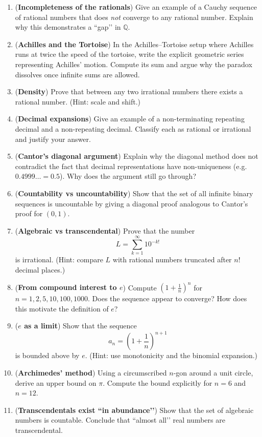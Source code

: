 \begin{enumerate}

\item (\textbf{Incompleteness of the rationals})
Give an example of a Cauchy sequence of rational numbers that does \emph{not} converge
to any rational number. Explain why this demonstrates a “gap’’ in $\mathbb{Q}$.

\item (\textbf{Achilles and the Tortoise})
In the Achilles–Tortoise setup where Achilles runs at twice the speed of the tortoise,
write the explicit geometric series representing Achilles’ motion.  
Compute its sum and argue why the paradox dissolves once infinite sums are allowed.

\item (\textbf{Density})
Prove that between any two irrational numbers there exists a rational number.
(Hint: scale and shift.)

\item (\textbf{Decimal expansions})
Give an example of a non-terminating repeating decimal and a non-repeating decimal.
Classify each as rational or irrational and justify your answer.

\item (\textbf{Cantor’s diagonal argument})
Explain why the diagonal method does not contradict the fact that decimal
representations have non-uniqueness (e.g.\ $0.4999\ldots = 0.5$).
Why does the argument still go through?

\item (\textbf{Countability vs uncountability})
Show that the set of all infinite binary sequences is uncountable
by giving a diagonal proof analogous to Cantor’s proof for $(0,1)$.

\item (\textbf{Algebraic vs transcendental})
Prove that the number
\[
L = \sum_{k=1}^\infty 10^{-k!}
\]
is irrational.  
(Hint: compare $L$ with rational numbers truncated after $n!$ decimal places.)

\item (\textbf{From compound interest to $e$})
Compute $\left(1+\frac{1}{n}\right)^{n}$ for $n=1,2,5,10,100,1000$.
Does the sequence appear to converge?
How does this motivate the definition of $e$?

\item (\textbf{$e$ as a limit})
Show that the sequence
\[
a_n = \left(1+\frac{1}{n}\right)^{n+1}
\]
is bounded above by $e$.  
(Hint: use monotonicity and the binomial expansion.)

\item (\textbf{Archimedes' method})
Using a circumscribed $n$-gon around a unit circle, derive an upper bound on $\pi$.
Compute the bound explicitly for $n=6$ and $n=12$.

\item (\textbf{Transcendentals exist “in abundance’’})
Show that the set of algebraic numbers is countable.
Conclude that “almost all’’ real numbers are transcendental.

\end{enumerate}

